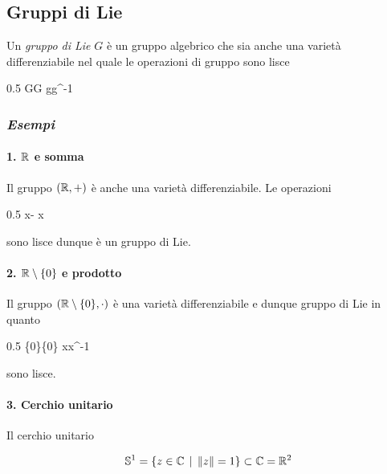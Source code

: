 \subsection{Gruppi di Lie}

Un \textit{gruppo di Lie} $ G $ è un gruppo algebrico che sia anche una varietà differenziabile nel quale le operazioni di gruppo sono lisce

	{0.5}{%
				{G}{G}
				{g}{g^{-1}}
			}

\subsubsection{\textit{Esempi}}

\paragraph{1. $ \mathbb{R} $ e somma}

Il gruppo $ (\mathbb{R},+) $ è anche una varietà differenziabile. Le operazioni

	{0.5}{%
				{\R}{\R}
				{x}{- x}
			}

sono lisce dunque è un gruppo di Lie.

\paragraph{2. $ \mathbb{R} \setminus \{0\} $ e prodotto}

Il gruppo $ (\mathbb{R} \setminus \{0\},\cdot) $ è una varietà differenziabile e dunque gruppo di Lie in quanto

	{0.5}{%
				{\R \setminus \{0\}}{\R \setminus \{0\}}
				{x}{x^{-1}}
			}

sono lisce.

\paragraph{3. Cerchio unitario}

Il cerchio unitario

\begin{equation}
	\mathbb{S}^{1} = \{ z \in \mathbb{C} \, \mid \, \norm{z} = 1 \} \subset \mathbb{C} = \mathbb{R}^{2}
\end{equation}


